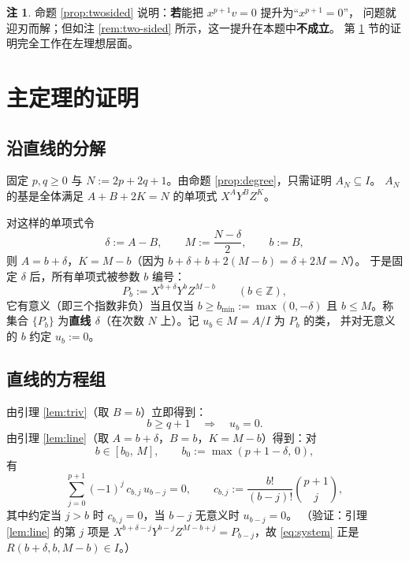 \documentclass[11pt,UTF8]{ctexart}
\theoremstyle{definition}
\newtheorem{remark}[theorem]{注}
\newcommand{\Z}{\mathbb{Z}}
\begin{document}
\begin{remark}
命题 \ref{prop:twosided} 说明：\textbf{若}能把 $x^{p+1}v=0$ 提升为“$x^{p+1}=0$”，
问题就迎刃而解；但如注 \ref{rem:two-sided} 所示，这一提升在本题中\textbf{不成立}。
第 \ref{sec:proof} 节的证明完全工作在左理想层面。
\end{remark}

\section{主定理的证明}\label{sec:proof}

\subsection{沿直线的分解}

固定 $p,q\ge0$ 与 $N:=2p+2q+1$。由命题 \ref{prop:degree}，只需证明 $A_N\subseteq I$。
$A_N$ 的基是全体满足 $A+B+2K=N$ 的单项式 $X^AY^BZ^K$。

对这样的单项式令
\[
\delta:=A-B,\qquad M:=\frac{N-\delta}{2},\qquad b:=B ,
\]
则 $A=b+\delta$，$K=M-b$（因为 $b+\delta+b+2(M-b)=\delta+2M=N$）。
于是固定 $\delta$ 后，所有单项式被参数 $b$ 编号：
\begin{equation}\label{eq:line-monomial}
P_b:=X^{b+\delta}Y^{b}Z^{M-b}\qquad(b\in\Z),
\end{equation}
它有意义（即三个指数非负）当且仅当
$b\ge b_{\min}:=\max(0,-\delta)$ 且 $b\le M$。称集合
$\{P_b\}$ 为\textbf{直线 $\delta$}（在次数 $N$ 上）。记 $u_b\in M=A/I$ 为 $P_b$ 的类，
并对无意义的 $b$ 约定 $u_b:=0$。

\subsection{直线的方程组}

由引理 \ref{lem:triv}（取 $B=b$）立即得到：
\begin{equation}\label{eq:known-zero}
b\ge q+1\quad\Longrightarrow\quad u_b=0 .
\end{equation}
由引理 \ref{lem:line}（取 $A=b+\delta$，$B=b$，$K=M-b$）得到：对
\begin{equation}\label{eq:anchor}
b\in[b_0,\,M],\qquad b_0:=\max(p+1-\delta,\,0),
\end{equation}
有
\begin{equation}\label{eq:system}
\sum_{j=0}^{p+1}(-1)^{j}\,c_{b,j}\,u_{b-j}=0,
\qquad c_{b,j}:=\frac{b!}{(b-j)!}\binom{p+1}{j},
\end{equation}
其中约定当 $j>b$ 时 $c_{b,j}=0$，当 $b-j$ 无意义时 $u_{b-j}=0$。
（验证：引理 \ref{lem:line} 的第 $j$ 项是
$X^{b+\delta-j}Y^{b-j}Z^{M-b+j}=P_{b-j}$，故 \eqref{eq:system} 正是 $R(b+\delta,b,M-b)\in I$。）
\end{document}
